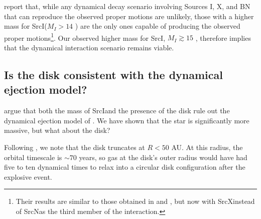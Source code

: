 \documentclass[twocolumn]{aastex61}
\newcommand{\sourcei}{SrcI}
\newcommand{\sourcen}{SrcN}
\newcommand{\sourcex}{SrcX}
\begin{document}
\citet{Farias2017a} report that, while any dynamical decay scenario involving
Sources I, X, and BN that can reproduce the observed proper motions are
unlikely, those with a higher mass for \sourcei ($M_I>14$ \msun) are the only
ones capable of producing the observed proper motions\footnote{Their results
are similar to those obtained in \citet{Goddi2011b} and \citet{Moeckel2012b},
but now with \sourcex instead of \sourcen as the third member of the
interaction.}.  Our observed higher mass for \sourcei, $M_I\gtrsim15$ \msun,
therefore implies that the
dynamical interaction scenario remains viable.



\subsection{Is the disk consistent with the dynamical ejection model?}
\citet{Plambeck2016a} argue that both the mass of \sourcei and the presence of
the disk rule out the dynamical ejection model of \citet{Bally2011a}.  We have
shown that the star is significantly more massive, but what about the disk?

Following \citet{Bally2011a}, we note that the disk truncates at $R<50$
AU.  At this radius, the orbital timescale is $\sim70$ years, so gas at the
disk's outer radius would have had five to ten dynamical times to relax into a
circular disk configuration after the explosive event.
\end{document}
